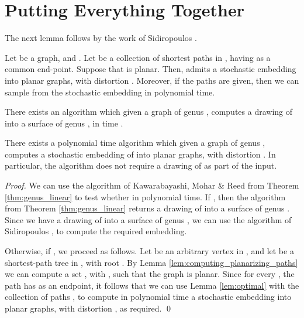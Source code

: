 \documentclass[envcountsect]{llncs}
\begin{document}
\section{Putting Everything Together}

The next lemma follows by the work of Sidiropoulos \cite{sidiropoulos2010optimal}.

\begin{lemma}\label{lem:optimal}
Let  be a graph, and .
Let  be a collection of shortest paths in , having  as a common end-point.
Suppose that  is planar.
Then,  admits a stochastic embedding into planar graphs, with distortion .
Moreover, if the paths  are given, then we can sample from the stochastic embedding in polynomial time.
\end{lemma}

\begin{theorem}\label{thm:genus_linear}
There exists an algorithm which given a graph  of genus , computes a drawing of  into a surface of genus , in time .
\end{theorem}


\begin{theorem}
There exists a polynomial time algorithm which given a graph  of genus , computes a stochastic embedding of  into planar graphs, with distortion .
In particular, the algorithm does not require a drawing of  as part of the input.
\end{theorem}
\begin{proof}
We can use the algorithm of Kawarabayashi, Mohar \& Reed from Theorem \ref{thm:genus_linear} to test whether  in polynomial time.
If , then the algorithm from Theorem \ref{thm:genus_linear} returns a drawing of  into a surface of genus .
Since we have a drawing of  into a surface of genus , we can use the algorithm of Sidiropoulos \cite{sidiropoulos2010optimal}, to compute the required embedding.

Otherwise, if , we proceed as follows.
Let  be an arbitrary vertex in , and let  be a shortest-path tree in , with root .
By Lemma \ref{lem:computing_planarizing_paths} we can compute a set , with , such that the graph  is planar.
Since for every , the path  has  as an endpoint, it follows that we can use Lemma \ref{lem:optimal} with the collection of paths , to compute in polynomial time a stochastic embedding into planar graphs, with distortion , as required.
\qed
\end{proof}






\end{document}
